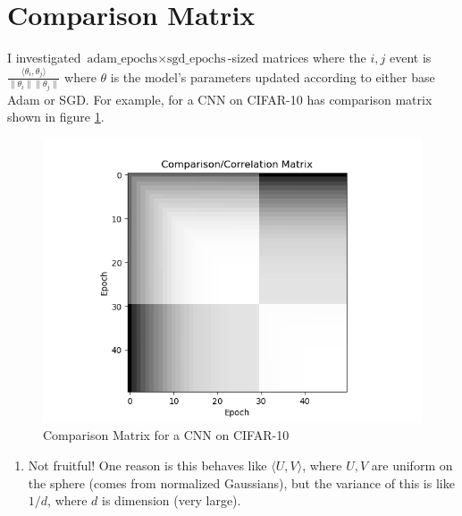 \documentclass[landscape,twocolumn]{article}
\newcommand{\1}{\mathds{1}}
\begin{document}
\thispagestyle{fancy}
\fancyhf{}
\section*{Comparison Matrix}
I investigated \(\textrm{adam\_epochs}\times\textrm{sgd\_epochs}\)-sized matrices where the \(i,j\) event is \(\frac{\langle \theta_i,\theta_j\rangle}{\|\theta_i\|\|\theta_j\|}\) where \(\theta\) is the model's parameters updated according to either base Adam or SGD. For example, for a CNN on CIFAR-10 has comparison matrix shown in figure \ref{fig:comparison_matrix}.
\begin{figure}[H]
    \centering
    \includegraphics[width=.70\linewidth]{../Notebooks/ComparisonMatrix.png}
    \caption{Comparison Matrix for a CNN on CIFAR-10}
    \label{fig:comparison_matrix}
\end{figure}
\begin{enumerate}
    \item[\textbullet] Not fruitful! One reason is this behaves like \(\langle U,V\rangle\), where \(U,V\) are uniform on the sphere (comes from normalized Gaussians), but the variance of this is like \(1/d\), where \(d\) is dimension (very large). 
\end{enumerate} \vspace*{-1cm}
\end{document}
